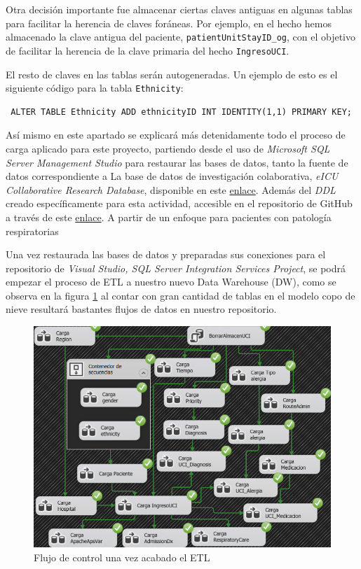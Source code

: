 \documentclass[12pt, a4paper, twoside]{article}
\begin{document}
	Otra decisión importante fue almacenar ciertas claves antiguas en algunas tablas para facilitar la herencia de claves foráneas. Por ejemplo, en el hecho hemos almacenado la clave antigua del paciente, \texttt{patientUnitStayID\_og}, con el objetivo de facilitar la herencia de la clave primaria del hecho \texttt{IngresoUCI}.
	
	El resto de claves en las tablas serán autogeneradas. Un ejemplo de esto es el siguiente código para la tabla \texttt{Ethnicity}:
	
	\begin{verbatim} ALTER TABLE Ethnicity ADD ethnicityID INT IDENTITY(1,1) PRIMARY KEY; 
	\end{verbatim}
	
	
	Así mismo en este apartado se explicará más detenidamente todo el proceso de carga aplicado para este proyecto, partiendo desde el uso de \textit{Microsoft SQL Server Management Studio} para restaurar las bases de datos, tanto la fuente de datos correspondiente a La base de datos de investigación colaborativa, \textit{eICU Collaborative Research Database}, disponible en este \href{https://uma365-my.sharepoint.com/:u:/g/personal/rmluque_uma_es/EebuEtDjp8VImt-_PhweiZMBu1_7XkPqZHkD74iGgg0fXQ?e=lOivcI}{enlace}. Además del \textit{DDL} creado específicamente para esta actividad, accesible en el repositorio de GitHub a través de este \href{https://github.com/Diegodepab/almacen_UCI_Sanitaria/blob/main/ETL/base_de_datos.ddl}{enlace}. A partir de un enfoque para pacientes con patología respiratorias 
	
	Una vez restaurada las bases de datos y preparadas sus conexiones para el repositorio de \textit{Visual Studio, SQL Server Integration Services Project}, se podrá empezar el proceso de ETL a nuestro nuevo Data Warehouse (DW), como se observa en la figura \ref{fig:2} al contar con gran cantidad de tablas en el modelo copo de nieve resultará bastantes flujos de datos en nuestro repositorio.
	
	
	\begin{figure}[H]
		\centering
		\includegraphics[width=1\textwidth]{image/100_ETL_ejecutandose.png}
		\caption{Flujo de control una vez acabado el ETL}
		\label{fig:2}
	\end{figure}
	
\end{document}
